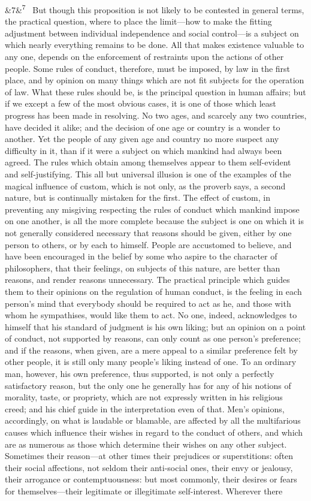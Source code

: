 \documentclass[12pt]{article}
\newcommand{\para}[1][]{\par\noindent\ifx&#1&\else\textsuperscript{\footnotesize #1}~\fi}
\begin{document}
\para[7] But though this proposition is not likely to be contested in general terms, the practical question, where to place the limit---how to make the fitting adjustment between individual independence and social control---is a subject on which nearly everything remains to be done. All that makes existence valuable to any one, depends on the enforcement of restraints upon the actions of other people. Some rules of conduct, therefore, must be imposed, by law in the first place, and by opinion on many things which are not fit subjects for the operation of law. What these rules should be, is the principal question in human affairs; but if we except a few of the most obvious cases, it is one of those which least progress has been made in resolving. No two ages, and scarcely any two countries, have decided it alike; and the decision of one age or country is a wonder to another. Yet the people of any given age and country no more suspect any difficulty in it, than if it were a subject on which mankind had always been agreed. The rules which obtain among themselves appear to them self-evident and self-justifying. This all but universal illusion is one of the examples of the magical influence of custom, which is not only, as the proverb says, a second nature, but is continually mistaken for the first. The effect of custom, in preventing any misgiving respecting the rules of conduct which mankind impose on one another, is all the more complete because the subject is one on which it is not generally considered necessary that reasons should be given, either by one person to others, or by each to himself. People are accustomed to believe, and have been encouraged in the belief by some who aspire to the character of philosophers, that their feelings, on subjects of this nature, are better than reasons, and render reasons unnecessary. The practical principle which guides them to their opinions on the regulation of human conduct, is the feeling in each person's mind that everybody should be required to act as he, and those with whom he sympathises, would like them to act. No one, indeed, acknowledges to himself that his standard of judgment is his own liking; but an opinion on a point of conduct, not supported by reasons, can only count as one person's preference; and if the reasons, when given, are a mere appeal to a similar preference felt by other people, it is still only many people's liking instead of one. To an ordinary man, however, his own preference, thus supported, is not only a perfectly satisfactory reason, but the only one he generally has for any of his notions of morality, taste, or propriety, which are not expressly written in his religious creed; and his chief guide in the interpretation even of that. Men's opinions, accordingly, on what is laudable or blamable, are affected by all the multifarious causes which influence their wishes in regard to the conduct of others, and which are as numerous as those which determine their wishes on any other subject. Sometimes their reason---at other times their prejudices or superstitions: often their social affections, not seldom their anti-social ones, their envy or jealousy, their arrogance or contemptuousness: but most commonly, their desires or fears for themselves---their legitimate or illegitimate self-interest. Wherever there 
\end{document}
